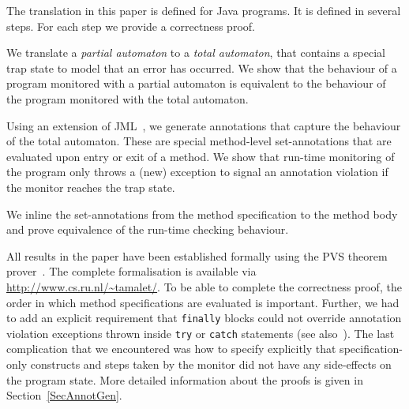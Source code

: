 The translation in this paper is defined for Java programs. It is
defined in several steps. For each step we provide a correctness
proof.
\begin{inparaenum}
\item We translate a \emph{partial automaton} to a \emph{total automaton},
that contains a special trap state to model that an error has
occurred.
We show that the behaviour of a program monitored with a partial
automaton is equivalent to the behaviour of the program monitored with
the total automaton.
\item Using an extension of JML~\cite{LeavensPCCRCK05}, we generate annotations
that capture the behaviour of the total automaton. These are special
method-level set-annotations that are evaluated upon entry or exit of
a method.  We show that run-time monitoring of the program only throws
a (new) exception to signal an annotation violation if the monitor
reaches the trap state.
\item We inline the set-annotations from the method specification
to the method body and prove equivalence of the run-time checking behaviour.
\end{inparaenum}
All results in the paper have been established formally using
the PVS theorem prover~\cite{OwreRRSS96}. The complete formalisation
is available via \url{http://www.cs.ru.nl/~tamalet/}. To be able to
complete the correctness proof, the order in which method
specifications are evaluated is important. Further, we had to add an
explicit requirement that \texttt{finally} blocks could not override
annotation violation exceptions thrown inside \texttt{try} or
\texttt{catch} statements (see also~\cite{Huisman08}). The last
complication that we encountered was how to specify explicitly that
specification-only constructs and steps taken by the monitor did not
have any side-effects on the program state. More detailed information
about the proofs is given in Section~\ref{SecAnnotGen}.

